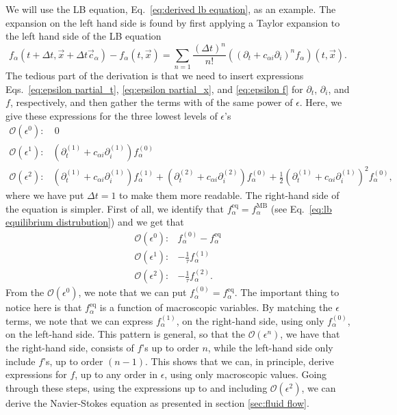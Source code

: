\documentclass[11pt,a4paper]{report}
\begin{document}
We will use the LB equation, Eq.~\eqref{eq:derived lb equation}, as an example. The expansion on the left hand side is found by first applying a Taylor expansion to the left hand side of the LB equation
\begin{equation}
 f_\alpha(t + \Delta t, \vec{x} + \Delta t\vec{c}_\alpha)-f_\alpha(t, \vec{x}) = \sum_{n=1} \frac{(\Delta t)^n}{n!}\left((\partial_t + c_{\alpha i}\partial_i)^{n}f_\alpha\right)(t, \vec{x}).
\end{equation}   
The tedious part of the derivation is that we need to insert expressions Eqs.~\eqref{eq:epsilon partial_t}, \eqref{eq:epsilon partial_x}, and \eqref{eq:epsilon f} for $\partial_t$, $\partial_i$, and $f$, respectively, and then gather the terms with of the same power of $\epsilon$.  Here, we give these expressions for the three lowest levels of $\epsilon$'s
\begin{align*}
\mathcal{O}(\epsilon^0):& \ 0 \\
\mathcal{O}(\epsilon^1):& \left(\partial^{(1)}_{t} + c_{\alpha i}\partial^{(1)}_{i}\right)f_\alpha^{(0)} \\
\mathcal{O}(\epsilon^2):& \left(\partial^{(1)}_{t} + c_{\alpha i}\partial^{(1)}_{i}\right)f_\alpha^{(1)} + \left(\partial^{(2)}_{t} + c_{\alpha i}\partial^{(2)}_{i}\right)f_\alpha^{(0)} 
+ \frac{1}{2}\left(\partial^{(1)}_{t} + c_{\alpha i}\partial^{(1)}_{i}\right)^2f_\alpha^{(0)}, 
\end{align*}
where we have put $\Delta t = 1$ to make them more readable. The right-hand side of the equation is simpler. First of all, we identify that $f_\alpha^\mathrm{eq} = f_\alpha^\mathrm{MB}$ (see Eq.~\eqref{eq:lb equilibrium distrubution}) and we get that
\begin{align*}
\mathcal{O}(\epsilon^0):&  f^{(0)}_\alpha - f_\alpha^\mathrm{eq} \\
\mathcal{O}(\epsilon^1):& -\frac{1}{\tau}f^{(1)}_\alpha \\
\mathcal{O}(\epsilon^2):& -\frac{1}{\tau}f^{(2)}_\alpha.
\end{align*}
From the $\mathcal{O}(\epsilon^0)$, we note that we can put $f^{(0)}_\alpha = f_\alpha^\mathrm{eq}$. The important thing to notice here is that $f_\alpha^\mathrm{eq}$ is a function of macroscopic variables. By matching the $\epsilon$ terms, we note that we can express $f_\alpha^{(1)}$, on the right-hand side, using only $f_\alpha^{(0)}$, on the left-hand side. This pattern is general, so that the $\mathcal{O}(\epsilon^n)$, we have that the right-hand side, consists of $f$'s up to order $n$, while the left-hand side only include $f$'s, up to order $(n-1)$. This shows that we can, in principle, derive expressions for $f$, up to any order in $\epsilon$, using only macroscopic values. Going through these steps, using the expressions up to and including $\mathcal{O}(\epsilon^2)$, we can derive the Navier-Stokes equation as presented in section \ref{sec:fluid flow}. 
\end{document}
